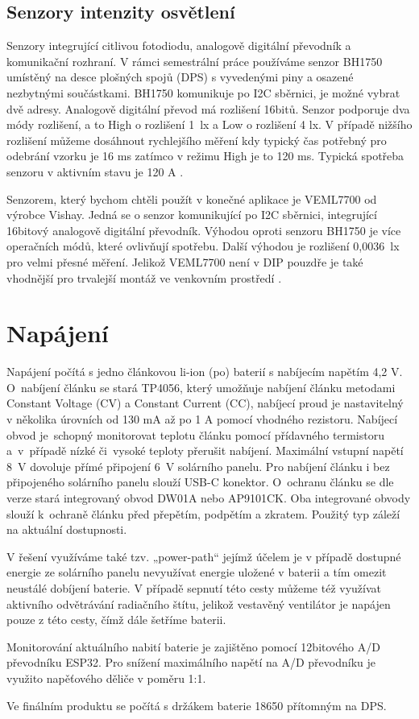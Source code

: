 \subsection{Senzory intenzity osvětlení}
\par Senzory integrující citlivou fotodiodu, analogově digitální převodník a komunikační rozhraní. V rámci semestrální práce používáme senzor BH1750 umístěný na desce plošných spojů (DPS) s vyvedenými piny a osazené nezbytnými součástkami. BH1750 komunikuje po I2C sběrnici, je možné vybrat dvě adresy. Analogově digitální převod má rozlišení 16bitů. Senzor podporuje dva módy rozlišení, a to High o rozlišení 1~lx a Low o rozlišení 4 lx. V případě nižšího rozlišení můžeme dosáhnout rychlejšího měření kdy typický čas potřebný pro odebrání vzorku je 16 ms zatímco v režimu High je to 120 ms. Typická spotřeba senzoru v aktivním stavu je 120 \mikro A \cite{xwYxo72XHkYoFpTN}.
\par Senzorem, který bychom chtěli použít v konečné aplikace je VEML7700 od výrobce Vishay. Jedná se o senzor komunikující po I2C sběrnici, integrující 16bitový analogově digitální převodník. Výhodou oproti senzoru BH1750 je více operačních módů, které ovlivňují spotřebu. Další výhodou je rozlišení 0,0036~lx pro velmi přesné měření. Jelikož VEML7700 není v DIP pouzdře je také vhodnější pro trvalejší montáž ve venkovním prostředí \cite{Schaar20Sep2019}.

\section{Napájení}
\par Napájení počítá s jedno článkovou li-ion (po) baterií s nabíjecím napětím 4,2 V. O~nabíjení článku se stará TP4056, který umožňuje nabíjení článku metodami Constant Voltage (CV) a Constant Current (CC), nabíjecí proud je nastavitelný v několika úrovních od 130 mA až po 1 A pomocí vhodného rezistoru. Nabíjecí obvod je~schopný monitorovat teplotu článku pomocí přídavného termistoru a~v~případě nízké či~vysoké teploty přerušit nabíjení. Maximální vstupní napětí 8~V dovoluje přímé připojení 6~V solárního panelu. Pro nabíjení článku i bez připojeného solárního panelu slouží USB-C konektor. O~ochranu článku se dle verze stará integrovaný obvod DW01A nebo AP9101CK. Oba integrované obvody slouží k~ochraně článku před přepětím, podpětím a zkratem. Použitý typ záleží na aktuální dostupnosti.
\par V řešení využíváme také tzv. „power-path“ jejímž účelem je v případě dostupné energie ze solárního panelu nevyužívat energie uložené v baterii a tím omezit neustálé dobíjení baterie. V případě sepnutí této cesty můžeme též využívat aktivního odvětrávání radiačního štítu, jelikož vestavěný ventilátor je napájen pouze z této cesty, čímž dále šetříme baterii.
\par Monitorování aktuálního nabití baterie je zajištěno pomocí 12bitového A/D převodníku ESP32. Pro snížení maximálního napětí na A/D převodníku je využito napěťového děliče v poměru 1:1.
\par Ve finálním produktu se počítá s držákem baterie 18650 přítomným na DPS.

